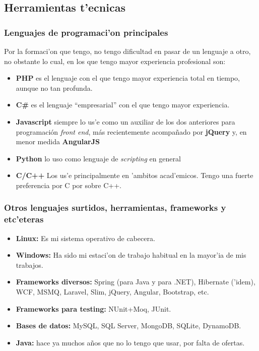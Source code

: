 \subsection*{Herramientas t'ecnicas}

\subsubsection*{Lenguajes de programaci'on principales} 
Por la formaci'on que tengo, no tengo dificultad en pasar de un lenguaje a otro, no obstante lo
cual, en los que tengo mayor experiencia profesional son:

\begin{itemize}
	\item \textbf{PHP} es el lenguaje con el que tengo mayor experiencia total en tiempo, aunque no
		tan profunda.
	\item \textbf{C\#} es el lenguaje ``empresarial'' con el que tengo mayor experiencia.
	\item \textbf{Javascript} siempre lo us'e  como un auxiliar de los dos anteriores para
		programación \emph{front end}, más recientemente acompañado por \textbf{jQuery} y, en menor
		medida \textbf{AngularJS}
	\item \textbf{Python} lo uso como lenguaje de \emph{scripting} en general
	\item \textbf{C/C++} Los us'e principalmente en 'ambitos acad'emicos.  Tengo una fuerte
		preferencia por C por sobre C++.
\end{itemize}

\subsubsection*{Otros lenguajes surtidos, herramientas, frameworks y etc'eteras}
\begin{itemize}
	\item \textbf{Linux:} Es mi sistema operativo de cabecera.
	\item \textbf{Windows:} Ha sido mi estaci'on de trabajo habitual en la mayor'ia de mis trabajos.
	\item \textbf{Frameworks diversos:} Spring (para Java y para .NET), Hibernate ('idem), WCF, MSMQ, Laravel,
		Slim, jQuery, Angular, Bootstrap, etc.
	\item \textbf{Frameworks para testing:} NUnit+Moq, JUnit.
	\item \textbf{Bases de datos:} MySQL, SQL Server, MongoDB, SQLite, DynamoDB.
	\item \textbf{Java:} hace ya muchos a\~nos que no lo tengo que usar, por falta de ofertas.
\end{itemize}

